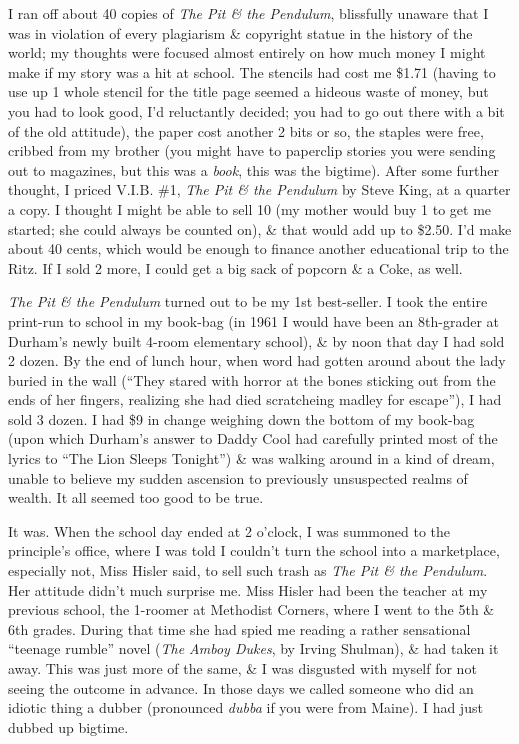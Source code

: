 \documentclass{article}
\numberwithin{equation}{section}
\begin{document}
I ran off about 40 copies of \textit{The Pit \& the Pendulum}, blissfully unaware that I was in violation of every plagiarism \& copyright statue in the history of the world; my thoughts were focused almost entirely on how much money I might make if my story was a hit at school. The stencils had cost me \$1.71 (having to use up 1 whole stencil for the title page seemed a hideous waste of money, but you had to look good, I'd reluctantly decided; you had to go out there with a bit of the old attitude), the paper cost another 2 bits or so, the staples were free, cribbed from my brother (you might have to paperclip stories you were sending out to magazines, but this was a \textit{book}, this was the bigtime). After some further thought, I priced V.I.B. \#1, \textit{The Pit \& the Pendulum} by Steve King, at a quarter a copy. I thought I might be able to sell 10 (my mother would buy 1 to get me started; she could always be counted on), \& that would add up to \$2.50. I'd make about 40 cents, which would be enough to finance another educational trip to the Ritz. If I sold 2 more, I could get a big sack of popcorn \& a Coke, as well.

\textit{The Pit \& the Pendulum} turned out to be my 1st best-seller. I took the entire print-run to school in my book-bag (in 1961 I would have been an 8th-grader at Durham's newly built 4-room elementary school), \& by noon that day I had sold 2 dozen. By the end of lunch hour, when word had gotten around about the lady buried in the wall (``They stared with horror at the bones sticking out from the ends of her fingers, realizing she had died scratcheing madley for escape''), I had sold 3 dozen. I had \$9 in change weighing down the bottom of my book-bag (upon which Durham's answer to Daddy Cool had carefully printed most of the lyrics to ``The Lion Sleeps Tonight'') \& was walking around in a kind of dream, unable to believe my sudden ascension to previously unsuspected realms of wealth. It all seemed too good to be true.

It was. When the school day ended at 2 o'clock, I was summoned to the principle's office, where I was told I couldn't turn the school into a marketplace, especially not, Miss Hisler said, to sell such trash as \textit{The Pit \& the Pendulum}. Her attitude didn't much surprise me. Miss Hisler had been the teacher at my previous school, the 1-roomer at Methodist Corners, where I went to the 5th \& 6th grades. During that time she had spied me reading a rather sensational ``teenage rumble'' novel (\textit{The Amboy Dukes}, by Irving Shulman), \& had taken it away. This was just more of the same, \& I was disgusted with myself for not seeing the outcome in advance. In those days we called someone who did an idiotic thing a dubber (pronounced \textit{dubba} if you were from Maine). I had just dubbed up bigtime.
\end{document}
